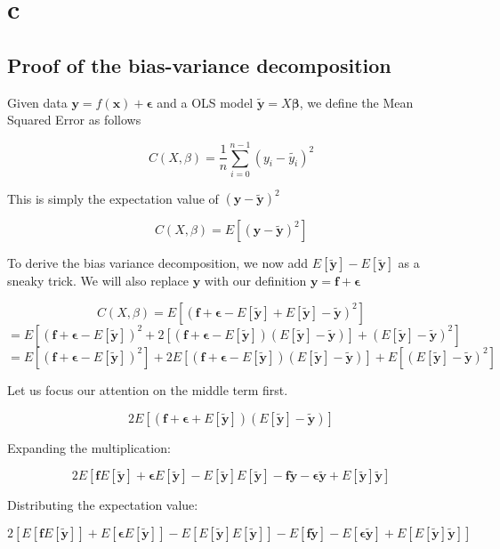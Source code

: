 \documentclass{article}
\begin{document}
\section{c}

\subsection{Proof of the bias-variance decomposition}

Given data $\bm{y} = f(\bm{x}) + \bm{\epsilon}$ and a OLS model $\bm{\tilde{y}} = X\bm{\beta}$, we define
the Mean Squared Error as follows

\[C(X,\beta) = \frac{1}{n}\sum_{i=0}^{n-1}(y_i - \tilde{y_i})^2\]

This is simply the expectation value of $(\bm{y} - \bm{\tilde{y}})^2$

\[ C(X,\beta) = E\left[(\bm{y} - \bm{\tilde{y}})^2\right] \]

To derive the bias variance decomposition, we now add $E[\bm{\tilde{y}}] - E[\bm{\tilde{y}}]$ 
as a sneaky trick. We will also replace $\bm{y}$ with our definition $\bm{y} = \bm{f} + \bm{\epsilon}$

\[ C(X,\beta) = E\left[(\bm{f} + \bm{\epsilon} - E[\bm{\tilde{y}}] + E[\bm{\tilde{y}}] - \bm{\tilde{y}})^2\right] \]
\[ = E\left[(\bm{f} + \bm{\epsilon} - E[\bm{\tilde{y}}])^2 + 2\left[(\bm{f} + \bm{\epsilon} - E[\bm{\tilde{y}}])(E[\bm{\tilde{y}}] - \bm{\tilde{y}})\right] +(E[\bm{\tilde{y}}] - \bm{\tilde{y}})^2\right] \]
\[ = E\left[(\bm{f} + \bm{\epsilon} - E[\bm{\tilde{y}}])^2\right] + 2E\left[(\bm{f} + \bm{\epsilon} - E[\bm{\tilde{y}}])(E[\bm{\tilde{y}}] - \bm{\tilde{y}})\right] + E\left[(E[\bm{\tilde{y}}] - \bm{\tilde{y}})^2\right] \]

Let us focus our attention on the middle term first.

\[ 2E\left[(\bm{f} + \bm{\epsilon} + E[\bm{\tilde{y}}])(E[\bm{\tilde{y}}] - \bm{\tilde{y}})\right] \]

Expanding the multiplication:

\[ 2E\left[\bm{f}E[\bm{\tilde{y}}] + \bm{\epsilon}E[\bm{\tilde{y}}] - E[\bm{\tilde{y}}]E[\bm{\tilde{y}}] - \bm{f}\bm{\tilde{y}} - \bm{\epsilon}\bm{\tilde{y}} + E[\bm{\tilde{y}}]\bm{\tilde{y}}\right] \]

Distributing the expectation value:

\[ 2\left[E[\bm{f}E[\bm{\tilde{y}}]] + E[\bm{\epsilon}E[\bm{\tilde{y}}]] - E[E[\bm{\tilde{y}}]E[\bm{\tilde{y}}]] - E[\bm{f}\bm{\tilde{y}}] - E[\bm{\epsilon}\bm{\tilde{y}}] + E[E[\bm{\tilde{y}}]\bm{\tilde{y}}]\right] \]
\end{document}

